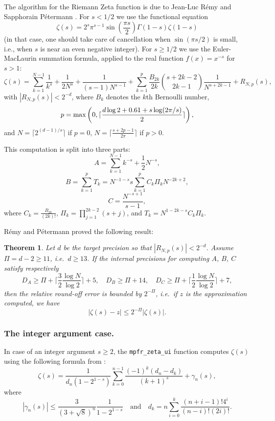 \documentclass[12pt]{amsart}
\newtheorem{theorem}{Theorem}
\begin{document}
The algorithm for the Riemann Zeta function is due to Jean-Luc R\'emy
and Sapphorain P\'etermann \cite{PeRe06,PeRe07}. For $s < 1/2$ we use the
functional equation
\[ \zeta(s) = 2^s \pi^{s-1} \sin\left(\frac{\pi s}{2}\right) \Gamma(1-s)
   \zeta(1-s) \]
(in that case, one should take care of cancellation when $\sin(\pi s/2)$ is
small, i.e., when $s$ is near an even negative integer).
For $s \geq 1/2$ we use the Euler-MacLaurin summation formula, applied
to the real function $f(x) = x^{-s}$ for $s > 1$:
\[ \zeta(s) = \sum_{k=1}^{N-1} \frac{1}{k^s} + \frac{1}{2N^s}
+ \frac{1}{(s-1)N^{s-1}} + \sum_{k=1}^p \frac{B_{2k}}{2k}
{s+2k-2 \choose 2k-1} \frac{1}{N^{s+2k-1}} + R_{N,p}(s), \]
with $|R_{N,p}(s)| < 2^{-d}$, where $B_k$ denotes the $k$th Bernoulli
number,
\[ p = {\rm max}\left( 0, \lceil \frac{d \log 2 + 0.61 + s \log(2\pi/s)}{2}
\rceil \right), \]
and $N = \lceil 2^{(d-1)/s} \rceil$ if $p=0$,
$N = \lceil \frac{s+2p-1}{2\pi} \rceil$ if $p > 0$.

This computation is split into three parts:
\[ A = \sum_{k=1}^{N-1} k^{-s} + \frac{1}{2} N^{-s}, \]
\[ B = \sum_{k=1}^p T_k = N^{-1-s} s \sum_{k=1}^p C_k \Pi_k N^{-2k+2}, \]
\[ C = \frac{N^{-s+1}}{s-1}, \]
where $C_k = \frac{B_{2k}}{(2k)!}$, $\Pi_k = \prod_{j=1}^{2k-2} (s+j)$,
and $T_k = N^{1-2k-s} C_k \Pi_k$.

R\'emy and P\'etermann proved the following result:
\begin{theorem}
Let $d$ be the target precision so that $|R_{N,p}(s)| < 2^{-d}$.
Assume $\Pi = d - 2 \geq 11$, i.e.\ $d \geq 13$. If the internal precisions
for computing $A$, $B$, $C$ satisfy respectively
\[ D_A \geq \Pi + \lceil \frac{3}{2} \frac{\log N}{\log 2} \rceil + 5, \quad
   D_B \geq \Pi + 14, \quad
   D_C \geq \Pi + \lceil \frac{1}{2} \frac{\log N}{\log 2} \rceil + 7, \]
then the relative round-off error is bounded by $2^{-\Pi}$, i.e.\ if $z$ is
the approximation computed, we have
\[ |\zeta(s) - z| \leq 2^{-\Pi} |\zeta(s)|. \]
\end{theorem}

\subsubsection{The integer argument case.}
In case of an integer argument $s \geq 2$,
the \texttt{mpfr\_zeta\_ui} function computes
$\zeta(s)$ using the following formula from \cite{Borwein95}:
\[ \zeta(s) = \frac{1}{d_n (1-2^{1-s})} \sum_{k=0}^{n-1} \frac{(-1)^k
  (d_n - d_k)}{(k+1)^s} + \gamma_n(s), \]
where
\[ |\gamma_n(s)| \leq \frac{3}{(3+\sqrt{8})^n} \frac{1}{1-2^{1-s}}
\quad \mbox{and} \quad
   d_k = n \sum_{i=0}^k \frac{(n+i-1)! 4^i}{(n-i)! (2i)!}. \]
\end{document}
